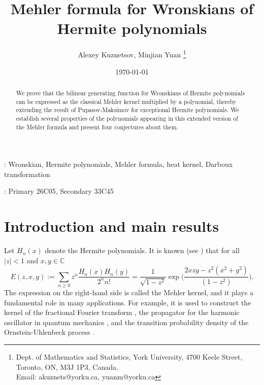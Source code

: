 \documentclass[12pt]{article}
\title{Mehler formula for Wronskians of Hermite polynomials}
\author{ 
{Alexey Kuznetsov, Minjian Yuan \footnote{Dept. of Mathematics and Statistics,  York University,
4700 Keele Street, Toronto, ON, M3J 1P3, Canada.  
\\  Email: akuznets@yorku.ca, yuanm@yorku.ca}}}
\date{\today}
\def\c{{\mathbb C}}
\begin{document}
\maketitle


\begin{abstract}
We prove that the bilinear generating function for Wronskians of Hermite polynomials can be expressed as the classical Mehler kernel multiplied by a polynomial, thereby extending the result of Pupasov-Maksimov \cite{Pupasov_2015} for exceptional Hermite polynomials. We establish several properties of the polynomials appearing in this extended version of the Mehler formula and present four conjectures about them.
\end{abstract}
%
{\vskip 0.15cm}
 : Wronskian, Hermite polynomials, Mehler formula, heat kernel, Darboux transformation
 
{\vskip 0.25cm}
 : Primary 26C05, Secondary  33C45






\section{Introduction and main results}

 Let $H_n(x)$ denote the Hermite polynomials. 
It is known (see \cite[formula (18.18.28)]{NIST}) that for all $|z|<1$ and $x,y\in \c$ 
\[
E(z,x,y):=\sum\limits_{n\geqslant 0} z^n \frac{H_n(x) H_n(y)}{2^n n!}=
\frac{1}{\sqrt{1-z^2}} \exp\bigg( \frac{2xzy-z^2(x^2+y^2)}{(1-z^2)} \bigg). 
\]
The expression on the right-hand side is called the Mehler kernel, and it plays a fundamental role in many applications. For example, it is used to construct the kernel of the fractional Fourier transform \cite{Namias1980}, the propagator for the harmonic oscillator in quantum mechanics \cite{Pupasov_2015}, and the transition probability density of the Ornstein-Uhlenbeck process \cite{Bakry2014}.  
\end{document}
